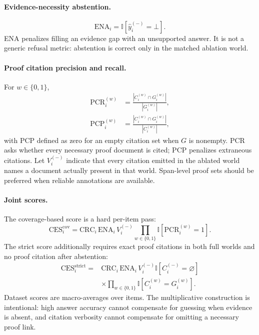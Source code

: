 \documentclass[10pt,twocolumn]{article}
\newcommand{\ind}{\mathbb{I}}
\newcommand{\botans}{\bot}
\begin{document}
\paragraph{Evidence-necessity abstention.}
\begin{equation}
\mathrm{ENA}_i=\ind[\hat y_i^{(-)}=\botans].
\end{equation}
ENA penalizes filling an evidence gap with an unsupported answer. It is not a generic refusal metric: abstention is correct only in the matched ablation world.

\paragraph{Proof citation precision and recall.}
For $w\in\{0,1\}$,
\begin{align}
 \mathrm{PCR}_i^{(w)} &= \frac{|C_i^{(w)}\cap G_i^{(w)}|}{|G_i^{(w)}|},\\
 \mathrm{PCP}_i^{(w)} &= \frac{|C_i^{(w)}\cap G_i^{(w)}|}{|C_i^{(w)}|},
\end{align}
with PCP defined as zero for an empty citation set when $G$ is nonempty. PCR asks whether every necessary proof document is cited; PCP penalizes extraneous citations. Let $V_i^{(-)}$ indicate that every citation emitted in the ablated world names a document actually present in that world. Span-level proof sets should be preferred when reliable annotations are available.

\paragraph{Joint scores.}
The coverage-based score is a hard per-item pass:
\begin{equation}
\mathrm{CES}^{\mathrm{cov}}_i=\mathrm{CRC}_i\,\mathrm{ENA}_i\,V_i^{(-)}
\prod_{w\in\{0,1\}}\ind[\mathrm{PCR}_i^{(w)}=1].
\end{equation}
The strict score additionally requires exact proof citations in both full worlds and no proof citation after abstention:
\begin{equation}
\begin{aligned}
\mathrm{CES}^{\mathrm{strict}}_i={}&\mathrm{CRC}_i\,\mathrm{ENA}_i\,V_i^{(-)}
\ind[C_i^{(-)}=\varnothing]\\
&\times\prod_{w\in\{0,1\}}\ind[C_i^{(w)}=G_i^{(w)}].
\end{aligned}
\end{equation}
Dataset scores are macro-averages over items. The multiplicative construction is intentional: high answer accuracy cannot compensate for guessing when evidence is absent, and citation verbosity cannot compensate for omitting a necessary proof link.
\end{document}
